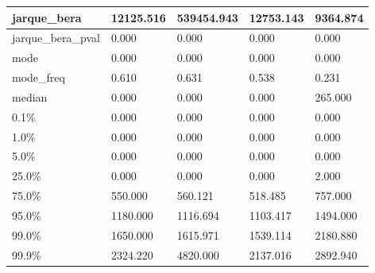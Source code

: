 \begin{table}[H]
\begin{tabular}{|l|m{10em}|m{10em}|m{10em}|m{10em}|}
\hline jarque\_bera & 12125.516 & 539454.943 & 12753.143 & 9364.874 \\
\hline jarque\_bera\_pval & 0.000 & 0.000 & 0.000 & 0.000 \\
\hline mode & 0.000 & 0.000 & 0.000 & 0.000 \\
\hline mode\_freq & 0.610 & 0.631 & 0.538 & 0.231 \\
\hline median & 0.000 & 0.000 & 0.000 & 265.000 \\
\hline 0.1\% & 0.000 & 0.000 & 0.000 & 0.000 \\
\hline 1.0\% & 0.000 & 0.000 & 0.000 & 0.000 \\
\hline 5.0\% & 0.000 & 0.000 & 0.000 & 0.000 \\
\hline 25.0\% & 0.000 & 0.000 & 0.000 & 2.000 \\
\hline 75.0\% & 550.000 & 560.121 & 518.485 & 757.000 \\
\hline 95.0\% & 1180.000 & 1116.694 & 1103.417 & 1494.000 \\
\hline 99.0\% & 1650.000 & 1615.971 & 1539.114 & 2180.880 \\
\hline 99.9\% & 2324.220 & 4820.000 & 2137.016 & 2892.940 \\
\hline
\end{tabular}
\end{table}
